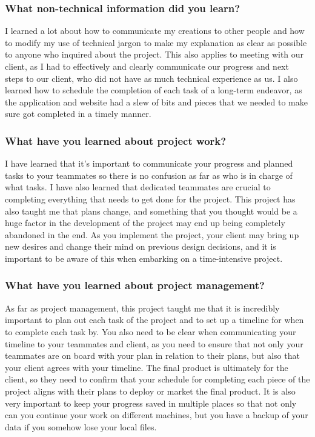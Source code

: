 \documentclass[onecolumn, draftclsnofoot,10pt, compsoc]{IEEEtran}
\begin{document}
    \subsubsection{What non-technical information did you learn?}
      I learned a lot about how to communicate my creations to other people and how to modify my use of technical jargon to make my explanation as clear as possible to anyone who inquired about the project. This also applies to meeting with our client, as I had to effectively and clearly communicate our progress and next steps to our client, who did not have as much technical experience as us. I also learned how to schedule the completion of each task of a long-term endeavor, as the application and website had a slew of bits and pieces that we needed to make sure got completed in a timely manner.

    \subsubsection{What have you learned about project work?}
      I have learned that it’s important to communicate your progress and planned tasks to your teammates so there is no confusion as far as who is in charge of what tasks. I have also learned that dedicated teammates are crucial to completing everything that needs to get done for the project. This project has also taught me that plans change, and something that you thought would be a huge factor in the development of the project may end up being completely abandoned in the end. As you implement the project, your client may bring up new desires and change their mind on previous design decisions, and it is important to be aware of this when embarking on a time-intensive project.

    \subsubsection{What have you learned about project management?}
      As far as project management, this project taught me that it is incredibly important to plan out each task of the project and to set up a timeline for when to complete each task by. You also need to be clear when communicating your timeline to your teammates and client, as you need to ensure that not only your teammates are on board with your plan in relation to their plans, but also that your client agrees with your timeline. The final product is ultimately for the client, so they need to confirm that your schedule for completing each piece of the project aligns with their plans to deploy or market the final product. It is also very important to keep your progress saved in multiple places so that not only can you continue your work on different machines, but you have a backup of your data if you somehow lose your local files.
\end{document}
